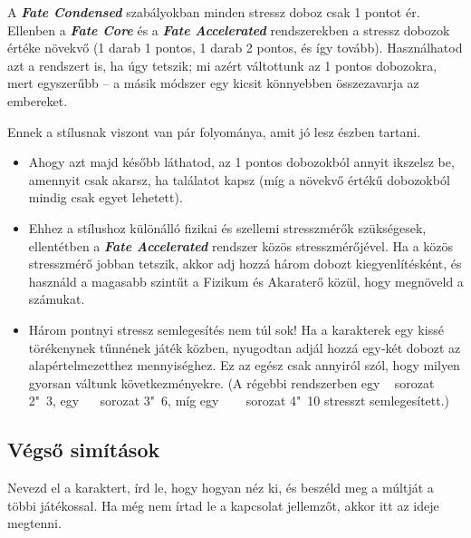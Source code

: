 \documentclass[oneside]{book}
\newcommand{\fate}[1]{\textbf{\textit{#1}}}
\begin{document}
A \fate{Fate Condensed} szabályokban minden stressz doboz csak 1 pontot ér. Ellenben a \fate{Fate Core} és a \fate{Fate Accelerated} rendszerekben a stressz dobozok értéke növekvő (1 darab 1 pontos, 1 darab 2 pontos, és így tovább). Használhatod azt a rendszert is, ha úgy tetszik; mi azért váltottunk az 1 pontos dobozokra, mert egyszerűbb – a másik módszer egy kicsit könnyebben összezavarja az embereket.

Ennek a stílusnak viszont van pár folyománya, amit jó lesz észben tartani.

\begin{itemize}
    \item Ahogy azt majd később láthatod, az 1 pontos dobozokból annyit ikszelsz be, amennyit csak akarsz, ha találatot kapsz (míg a növekvő értékű dobozokból mindig csak egyet lehetett).
    \item Ehhez a stílushoz különálló fizikai és szellemi stresszmérők szükségesek, ellentétben a \fate{Fate Accelerated} rendszer közös stresszmérőjével. Ha a közös stresszmérő jobban tetszik, akkor adj hozzá három dobozt kiegyenlítésként, és használd a magasabb szintűt a Fizikum és Akaraterő közül, hogy megnöveld a számukat.
    \item Három pontnyi stressz semlegesítés nem túl sok! Ha a karakterek egy kissé törékenynek tűnnének játék közben, nyugodtan adjál hozzá egy‑két dobozt az alapértelmezetthez mennyiséghez. Ez az egész csak annyiról szól, hogy milyen gyorsan váltunk következményekre. (A régebbi rendszerben egy ~ sorozat 2"~3, egy ~~ sorozat 3"~6, míg egy ~~~ sorozat 4"~10 stresszt semlegesített.)
\end{itemize}

\subsection{Végső simítások}

Nevezd el a karaktert, írd le, hogy hogyan néz ki, és beszéld meg a múltját a többi játékossal. Ha még nem írtad le a kapcsolat jellemzőt, akkor itt az ideje megtenni.
\end{document}
